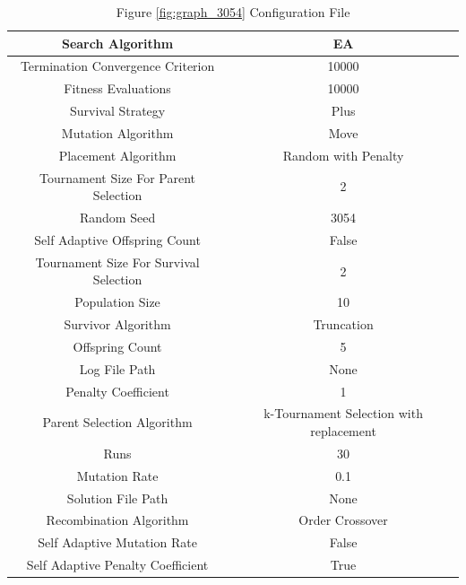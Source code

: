 \documentclass{standalone}
\begin{document}
\begin{table}[!htb]
	\centering
	\caption{Figure \ref{fig:graph_3054} Configuration File}
	\label{tab:graph_3054}
	\begin{tabular}{| c | c |}
		\hline
		Search Algorithm		& EA		 \\
		\hline
		Termination Convergence Criterion		& 10000		 \\
		\hline
		Fitness Evaluations		& 10000		 \\
		\hline
		Survival Strategy		& Plus		 \\
		\hline
		Mutation Algorithm		& Move		 \\
		\hline
		Placement Algorithm		& Random with Penalty		 \\
		\hline
		Tournament Size For Parent Selection		& 2		 \\
		\hline
		Random Seed		& 3054		 \\
		\hline
		Self Adaptive Offspring Count		& False		 \\
		\hline
		Tournament Size For Survival Selection		& 2		 \\
		\hline
		Population Size		& 10		 \\
		\hline
		Survivor Algorithm		& Truncation		 \\
		\hline
		Offspring Count		& 5		 \\
		\hline
		Log File Path		& None		 \\
		\hline
		Penalty Coefficient		& 1		 \\
		\hline
		Parent Selection Algorithm		& k-Tournament Selection with replacement		 \\
		\hline
		Runs		& 30		 \\
		\hline
		Mutation Rate		& 0.1		 \\
		\hline
		Solution File Path		& None		 \\
		\hline
		Recombination Algorithm		& Order Crossover		 \\
		\hline
		Self Adaptive Mutation Rate		& False		 \\
		\hline
		Self Adaptive Penalty Coefficient		& True		 \\
		\hline
	\end{tabular}
\end{table}
\end{document}
